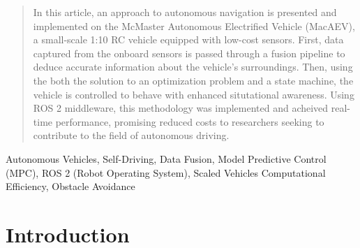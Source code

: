 \documentclass[conference]{IEEEtran}
\begin{document}
\begin{abstract}
In this article, an approach to autonomous navigation is presented and implemented on the McMaster Autonomous Electrified Vehicle (MacAEV), a small-scale 1:10 RC vehicle equipped with low-cost sensors. First, data captured from the onboard sensors is passed through a fusion pipeline to deduce accurate information about the vehicle's surroundings. Then, using the both the solution to an optimization problem and a state machine, the vehicle is controlled to behave with enhanced situtational awareness. Using ROS 2 middleware, this methodology was implemented and acheived real-time performance, promising reduced costs to researchers seeking to contribute to the field of autonomous driving. 








\end{abstract}

\begin{IEEEkeywords}
Autonomous Vehicles, Self-Driving, Data Fusion, Model Predictive Control (MPC), ROS 2 (Robot Operating System), Scaled Vehicles
Computational Efficiency, Obstacle Avoidance
\end{IEEEkeywords}

\section{Introduction}


\end{document}
